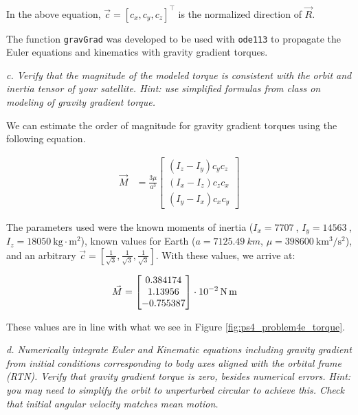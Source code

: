 In the above equation, $\Vec{c} = [c_x, c_y, c_z]^\intercal$ is the normalized direction of $\Vec{R}$.

The function \texttt{gravGrad} was developed to be used with \texttt{ode113} to propagate the Euler equations and kinematics with gravity gradient torques.



\textit{c. Verify that the magnitude of the modeled torque is consistent with the orbit and inertia tensor of your satellite. Hint: use simplified formulas from class on modeling of gravity gradient torque.}

We can estimate the order of magnitude for gravity gradient torques using the following equation.

\begin{align*}
    \Vec{M} &= \frac{3 \mu}{a^3}
    \begin{bmatrix}
    (I_z - I_y) c_y c_z \\
    (I_x - I_z) c_z c_x \\
    (I_y - I_x) c_x c_y
    \end{bmatrix}
\end{align*}

The parameters used were the known moments of inertia ($I_x = \qty{7707}{}$, $I_y = \qty{14563}{}$, $I_z = \qty{18050}{\kilogram\cdot\meter^2}$), known values for Earth ($a = \qty{7125.49}{km}$, $\mu = \qty{398600}{\km^3\per\second^2}$), and an arbitrary $\Vec{c} = [\frac{1}{\sqrt{3}}, \frac{1}{\sqrt{3}}, \frac{1}{\sqrt{3}}]$. With these values, we arrive at:

\begin{align*}
    \Vec{M} &=
\qty[parse-numbers = false]{
    \begin{bmatrix}
    0.384174 \\
    1.13956 \\
    -0.755387
    \end{bmatrix}
    \cdot
    10^{-2}
}{\newton\meter}
\end{align*}

These values are in line with what we see in Figure \ref{fig:ps4_problem4e_torque}.

\newpage
\textit{d. Numerically integrate Euler and Kinematic equations including gravity gradient from initial conditions corresponding to body axes aligned with the orbital frame (RTN). Verify that gravity gradient torque is zero, besides numerical errors. Hint: you may need to simplify the orbit to unperturbed circular to achieve this. Check that initial angular velocity matches mean motion.}

